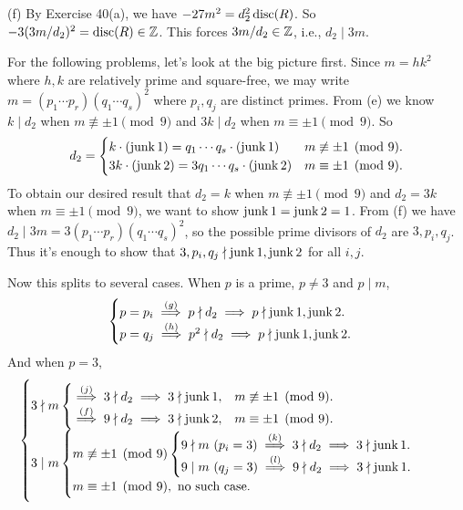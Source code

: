 \documentclass[../Marcus.tex]{subfiles}
\begin{document}
(f) By Exercise 40(a), we have $-27m^2=d_2^2\operatorname{disc}(R)$. So $-3(3m/d_2)^2=\operatorname{disc}(R)\in\mathbb{Z}$. This forces $3m/d_2\in\mathbb{Z}$, i.e., $d_2\mid 3m$.

For the following problems, let's look at the big picture first. Since $m=hk^2$ where $h,k$ are relatively prime and square-free, we may write $m=(p_1\cdots p_r)(q_1\cdots q_s)^2$ where $p_i,q_j$ are distinct primes. From (e) we know $k\mid d_2$ when $m\not\equiv \pm1 \pmod{9}$ and $3k\mid d_2$ when $m\equiv \pm1 \pmod{9}$. So
$$
d_2 =
\begin{cases}
    k\cdot(\operatorname{junk}1) = q_1\cdots q_s\cdot(\operatorname{junk}1) & m\not\equiv \pm1 \pmod{9}. \\
    3k\cdot(\operatorname{junk}2) = 3q_1\cdots q_s\cdot(\operatorname{junk}2) & m\equiv \pm1 \pmod{9}.
\end{cases}
$$
To obtain our desired result that $d_2=k$ when $m\not\equiv \pm1 \pmod{9}$ and $d_2=3k$ when $m\equiv \pm1 \pmod{9}$, we want to show $\operatorname{junk}1=\operatorname{junk}2=1$. From (f) we have $d_2\mid 3m=3(p_1\cdots p_r)(q_1\cdots q_s)^2$, so the possible prime divisors of $d_2$ are $3,p_i,q_j$. Thus it's enough to show that $3,p_i,q_j\nmid\operatorname{junk}1,\operatorname{junk}2$ for all $i,j$.

Now this splits to several cases. When $p$ is a prime, $p\neq 3$ and $p\mid m$,
$$
\begin{cases}
    p=p_i \overset{(g)}{\implies} p\nmid d_2 \implies p\nmid\jk1,\jk2. \\
    p=q_j \overset{(h)}{\implies} p^2\nmid d_2 \implies p\nmid\jk1,\jk2. \\
\end{cases}
$$
And when $p=3$,
$$
\begin{cases}
    3\nmid m
    \begin{cases}
        \overset{(j)}{\implies} 3\nmid d_2 \implies 3\nmid\jk1, & m\not\equiv \pm1 \pmod{9}. \\
        \overset{(f)}{\implies} 9\nmid d_2 \implies 3\nmid\jk2, & m\equiv \pm1 \pmod{9}.
    \end{cases}\\

3\mid m
    \begin{cases}
        m\not\equiv \pm1 \pmod{9}
        \begin{cases}
            9\nmid m \ ( p_i=3) \overset{(k)}{\implies} 3\nmid d_2 \implies 3\nmid\jk1. \\
            9\mid m  \ ( q_j=3) \overset{(l)}{\implies} 9\nmid d_2 \implies 3\nmid\jk1. 
        \end{cases} \\
        m\equiv \pm1 \pmod{9}, \text{ no such case.}
    \end{cases}
\end{cases}
$$
\end{document}
